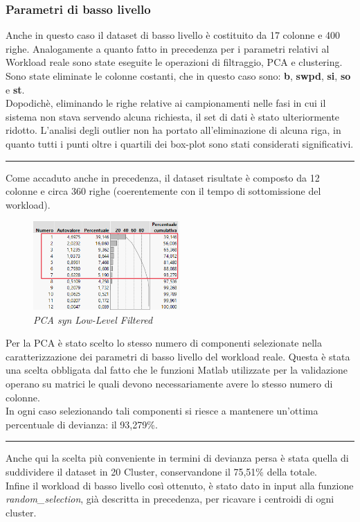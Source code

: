 \subsubsection{Parametri di basso livello}
Anche in questo caso il dataset di basso livello è costituito da 17 colonne e 400 righe. Analogamente a quanto fatto in precedenza per i parametri relativi al Workload reale sono state eseguite le operazioni di filtraggio, PCA e clustering.
\\
Sono state eliminate le colonne costanti, che in questo caso sono: \textbf{b}, \textbf{swpd}, \textbf{si}, \textbf{so} e \textbf{st}.
\\
Dopodichè, eliminando le righe relative ai campionamenti nelle fasi in cui il sistema non stava servendo alcuna richiesta, il set di dati è stato ulteriormente ridotto. L'analisi degli outlier non ha portato all'eliminazione di alcuna riga, in quanto tutti i punti oltre i quartili dei box-plot sono stati considerati significativi. 
\\
\hrule
\vspace{0.3cm}
Come accaduto anche in precedenza, il dataset risultate è composto da 12 colonne e circa 360 righe (coerentemente con il tempo di sottomissione del workload).
\\
\begin{figure}[H]
	\centering
	\includegraphics[width=0.5\textwidth]{img/hw3/PCA7_syn.png}
	\caption{\textit{PCA syn Low-Level Filtered}}
\end{figure}
Per la PCA è stato scelto lo stesso numero di componenti selezionate nella caratterizzazione dei parametri di basso livello del workload reale.
Questa è stata una scelta obbligata dal fatto che le funzioni Matlab utilizzate per la validazione operano su matrici le quali devono necessariamente avere lo stesso numero di colonne.
\\
In ogni caso selezionando tali componenti si riesce a mantenere un'ottima percentuale di devianza: il 93,279\%.
\\
\hrule
\vspace{0.3cm}
Anche qui la scelta più conveniente in termini di devianza persa è stata quella di suddividere il dataset in 20 Cluster, conservandone il 75,51\% della totale. 
\\
Infine il workload di basso livello così ottenuto, è stato dato in input alla funzione \textit{random\_selection}, già descritta in precedenza, per ricavare i centroidi di ogni cluster.
